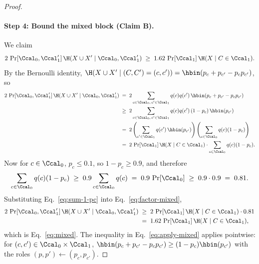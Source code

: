 \begin{proof}
\paragraph{Step 4: Bound the mixed block (Claim B).}
We claim
\begin{align}\label{eq:mixed}
2 \, \Pr[\Ccal_0, \Ccal_1'] \, \H(X \cup X' \mid \Ccal_0, \Ccal_1')
\;\ge\; 1.62 \, \Pr[\Ccal_1] \, \H(X \mid C \in \Ccal_1).
\end{align}
By the Bernoulli identity, $\H(X \cup X' \mid (C, C') = (c, c'))
= \hbin(p_c + p_{c'} - p_c p_{c'})$, so
\begin{align}
2 \, \Pr[\Ccal_0, \Ccal_1'] \, \H(X \cup X' \mid \Ccal_0, \Ccal_1')
&\;=\; 2 \sum_{c \in \Ccal_0,\, c' \in \Ccal_1} q(c) q(c') \, \hbin(p_c + p_{c'} - p_c p_{c'}) \notag\\
&\;\ge\; 2 \sum_{c \in \Ccal_0,\, c' \in \Ccal_1} q(c) q(c') \, (1 - p_c) \, \hbin(p_{c'}) \label{eq:apply-mixed}\\
&\;=\; 2 \left( \sum_{c' \in \Ccal_1} q(c') \, \hbin(p_{c'}) \right) \left( \sum_{c \in \Ccal_0} q(c) (1 - p_c) \right) \notag\\
&\;=\; 2 \, \Pr[\Ccal_1] \, \H(X \mid C \in \Ccal_1) \cdot \sum_{c \in \Ccal_0} q(c) (1 - p_c). \label{eq:factor-mixed}
\end{align}
Now for $c \in \Ccal_0$, $p_c \le 0.1$, so $1 - p_c \ge 0.9$, and therefore
\begin{align}\label{eq:sum-1-pc}
\sum_{c \in \Ccal_0} q(c) (1 - p_c) \;\ge\; 0.9 \sum_{c \in \Ccal_0} q(c) \;=\; 0.9 \, \Pr[\Ccal_0]
\;\ge\; 0.9 \cdot 0.9 \;=\; 0.81.
\end{align}
Substituting Eq.~\eqref{eq:sum-1-pc} into Eq.~\eqref{eq:factor-mixed},
\begin{align*}
2 \, \Pr[\Ccal_0, \Ccal_1'] \, \H(X \cup X' \mid \Ccal_0, \Ccal_1')
&\;\ge\; 2 \, \Pr[\Ccal_1] \, \H(X \mid C \in \Ccal_1) \cdot 0.81 \\
&\;=\; 1.62 \, \Pr[\Ccal_1] \, \H(X \mid C \in \Ccal_1),
\end{align*}
which is Eq.~\eqref{eq:mixed}. The inequality in Eq.~\eqref{eq:apply-mixed}
applies  pointwise: for $(c, c') \in \Ccal_0 \times \Ccal_1$,
$\hbin(p_c + p_{c'} - p_c p_{c'}) \ge (1 - p_c) \hbin(p_{c'})$ with the roles
$(p, p') \leftarrow (p_c, p_{c'})$.


\end{proof}

